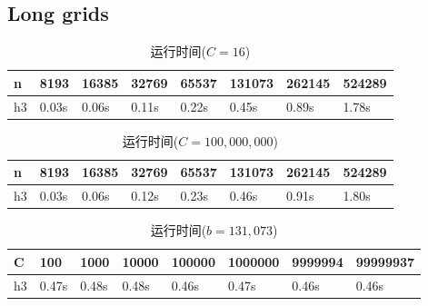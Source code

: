 \subsection{Long grids}
\begin{table}[H]
  \caption{运行时间($C=16$)}
  \label{tab22}
  \centering
  \begin{tabular}{p{1.5cm}<{\centering}p{1.5cm}<{\centering}p{1.5cm}<{\centering}p{1.5cm}<{\centering}p{1.5cm}<{\centering}p{1.5cm}<{\centering}p{1.5cm}<{\centering}p{1.5cm}<{\centering}}
  \toprule
   n & 8193 & 16385 & 32769 & 65537 & 131073 &262145 &524289\\
  \midrule
   h3  & 0.03s & 0.06s & 0.11s & 0.22s & 0.45s & 0.89s & 1.78s \\
  \bottomrule
  \end{tabular} 
\end{table}
\begin{table}[H]
  \caption{运行时间($C=100,000,000$)}
  \label{tab23}
  \centering
  \begin{tabular}{p{1.5cm}<{\centering}p{1.5cm}<{\centering}p{1.5cm}<{\centering}p{1.5cm}<{\centering}p{1.5cm}<{\centering}p{1.5cm}<{\centering}p{1.5cm}<{\centering}p{1.5cm}<{\centering}}
  \toprule
   n & 8193 & 16385 & 32769 & 65537 & 131073 &262145 &524289\\
  \midrule
   h3  & 0.03s & 0.06s & 0.12s & 0.23s & 0.46s & 0.91s & 1.80s \\
  \bottomrule
  \end{tabular} 
\end{table}
\begin{table}[H]
  \caption{运行时间($b=131,073$)}
  \label{tab24}
  \centering
  \begin{tabular}{p{1.5cm}<{\centering}p{1.5cm}<{\centering}p{1.5cm}<{\centering}p{1.5cm}<{\centering}p{1.5cm}<{\centering}p{1.5cm}<{\centering}p{1.5cm}<{\centering}p{1.5cm}<{\centering}}
  \toprule
   C & 100 & 1000 & 10000 & 100000 & 1000000 &9999994 & 99999937\\
  \midrule
   h3  & 0.47s & 0.48s & 0.48s & 0.46s & 0.47s & 0.46s & 0.46s \\
  \bottomrule
  \end{tabular} 
\end{table}

